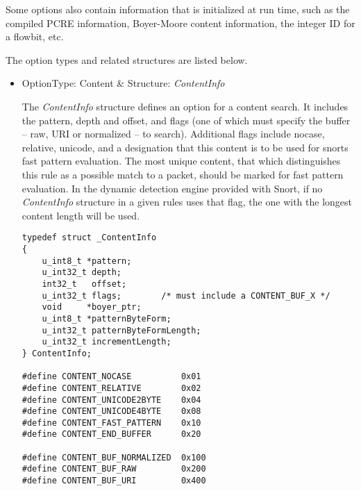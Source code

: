 \documentclass[english]{report}
\begin{document}
Some options also contain information that is initialized at run time, such as
the compiled PCRE information, Boyer-Moore content information, the integer ID
for a flowbit, etc.

The option types and related structures are listed below.

\begin{itemize}
%
%

\item {OptionType: Content \& Structure: {\em ContentInfo}}

The {\em ContentInfo} structure defines an option for a content search.  It
includes the pattern, depth and offset, and flags (one of which must specify
the buffer -- raw, URI or normalized -- to search).  Additional flags include
nocase, relative, unicode, and a designation that this content is to be used
for snorts fast pattern evaluation.  The most unique content, that which
distinguishes this rule as a possible match to a packet, should be marked for
fast pattern evaluation.  In the dynamic detection engine provided with Snort,
if no {\em ContentInfo} structure in a given rules uses that flag, the one with
the longest content length will be used.

\begin{verbatim}
typedef struct _ContentInfo
{
    u_int8_t *pattern;
    u_int32_t depth;
    int32_t   offset;
    u_int32_t flags;        /* must include a CONTENT_BUF_X */
    void     *boyer_ptr;
    u_int8_t *patternByteForm;
    u_int32_t patternByteFormLength;
    u_int32_t incrementLength;
} ContentInfo;

#define CONTENT_NOCASE          0x01
#define CONTENT_RELATIVE        0x02
#define CONTENT_UNICODE2BYTE    0x04
#define CONTENT_UNICODE4BYTE    0x08
#define CONTENT_FAST_PATTERN    0x10
#define CONTENT_END_BUFFER      0x20

#define CONTENT_BUF_NORMALIZED  0x100
#define CONTENT_BUF_RAW         0x200
#define CONTENT_BUF_URI         0x400
\end{verbatim}


\end{itemize}
\end{document}

